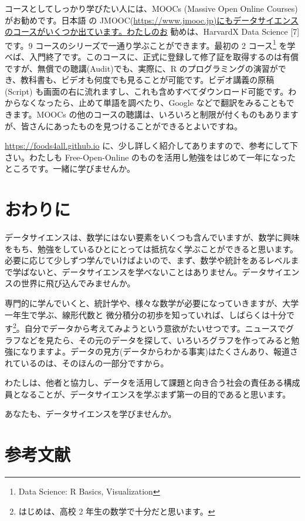 \documentclass[
]{book}
\theoremstyle{definition}
\theoremstyle{definition}
\theoremstyle{definition}
\theoremstyle{definition}
\theoremstyle{remark}
\begin{document}
コースとしてしっかり学びたい人には、MOOCs (Massive Open Online Courses) がお勧めです。日本語 の JMOOC(\url{https://www.jmooc.jp)にもデータサイエンスのコースがいくつか出ています。わたしのお} 勧めは、HarvardX Data Science {[}7{]} です。9 コースのシリーズで一通り学ぶことができます。最初の 2 コース\footnote{Data Science: R Basics, Visualization} を学べば、入門終了です。このコースに、正式に登録して修了証を取得するのは有償ですが、無償での聴講(Audit)でも、実際に、R のプログラミングの演習ができ、教科書も、ビデオも何度でも見ることが可能です。ビデオ講義の原稿 (Script) も画面の右に流れますし、これも含めすべてダウンロード可能です。わからなくなったら、止めて単語を調べたり、Google などで翻訳をみることもできます。MOOCs の他のコースの聴講は、いろいろと制限が付くものもありますが、皆さんにあったものを見つけることができるとよいですね。

\url{https://foods4all.github.io} に、少し詳しく紹介してありますので、参考にして下さい。わたしも Free-Open-Online のものを活用し勉強をはじめて一年になったところです。一緒に学びませんか。

\hypertarget{ux304aux308fux308aux306b-1}{%
\section{おわりに}\label{ux304aux308fux308aux306b-1}}

データサイエンスは、数学にはない要素をいくつも含んでいますが、数学に興味をもち、勉強をしているひとにとっては抵抗なく学ぶことができると思います。必要に応じて少しずつ学んでいけばよいので、まず、数学や統計をあるレベルまで学ばないと、データサイエンスを学べないことはありません。データサイエンスの世界に飛び込んでみませんか。

専門的に学んでいくと、統計学や、様々な数学が必要になっていきますが、大学一年生で学ぶ、線形代数と 微分積分の初歩を知っていれば、しばらくは十分です\footnote{はじめは、高校 2 年生の数学で十分だと思います。}。自分でデータから考えてみようという意欲がたいせつです。ニュースでグラフなどを見たら、その元のデータを探して、いろいろグラフを作ってみると勉強になりますよ。データの見方(データからわかる事実)はたくさんあり、報道されているのは、そのほんの一部分ですから。

わたしは、他者と協力し、データを活用して課題と向き合う社会の責任ある構成員となることが、データサイエンスを学ぶまず第一の目的であると思います。

あなたも、データサイエンスを学びませんか。

\hypertarget{ux53c2ux8003ux6587ux732e-1}{%
\section*{参考文献}\label{ux53c2ux8003ux6587ux732e-1}}
\end{document}
